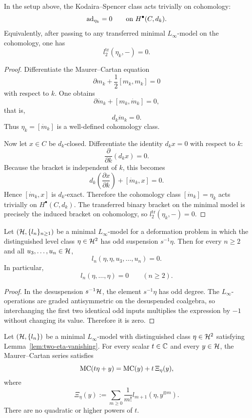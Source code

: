 \begin{theorem}
\label{thm:ks-centrality}
In the setup above, the Kodaira--Spencer class acts trivially on cohomology:
\[
\mathrm{ad}_{\eta_k}=0\qquad\text{on }H^\bullet(C,d_k).
\]
Equivalently, after passing to any transferred minimal $L_\infty$-model on the
cohomology, one has
\[
l_2^{\mathrm{tr}}(\eta_k,-)=0.
\]
\end{theorem}

\begin{proof}
Differentiate the Maurer--Cartan equation
\[
\partial m_k+\frac12[m_k,m_k]=0
\]
with respect to $k$.  One obtains
\[
\partial \dot m_k+[m_k,\dot m_k]=0,
\]
that is,
\[
d_k\dot m_k=0.
\]
Thus $\eta_k=[\dot m_k]$ is a well-defined cohomology class.

Now let $x\in C$ be $d_k$-closed.  Differentiate the identity $d_kx=0$ with
respect to $k$:
\[
\frac{\partial}{\partial k}(d_kx)=0.
\]
Because the bracket is independent of $k$, this becomes
\[
d_k\!\left(\frac{\partial x}{\partial k}\right)+[\dot m_k,x]=0.
\]
Hence $[\dot m_k,x]$ is $d_k$-exact.  Therefore the cohomology class
$[\dot m_k]=\eta_k$ acts trivially on $H^\bullet(C,d_k)$.  The transferred binary
bracket on the minimal model is precisely the induced bracket on cohomology, so
$l_2^{\mathrm{tr}}(\eta_k,-)=0$.\end{proof}

\begin{lemma}
\label{lem:two-eta-vanishing}
Let $(\mathcal{H},\{l_n\}_{n\ge 1})$ be a minimal $L_\infty$-model for a deformation
problem in which the distinguished level class $\eta\in \mathcal{H}^2$ has odd
suspension $s^{-1}\eta$.  Then for every $n\ge 2$ and all $u_3,\dots,u_n\in\mathcal{H}$,
\[
l_n(\eta,\eta,u_3,\dots,u_n)=0.
\]
In particular,
\[
l_n(\eta,\dots,\eta)=0\qquad(n\ge 2).
\]
\end{lemma}

\begin{proof}
In the desuspension $s^{-1}\mathcal{H}$, the element $s^{-1}\eta$ has odd degree.  The
$L_\infty$-operations are graded antisymmetric on the desuspended coalgebra, so
interchanging the first two identical odd inputs multiplies the expression by
$-1$ without changing its value.  Therefore it is zero.\end{proof}

\begin{theorem}
\label{thm:affine-normal-form}
Let $(\mathcal{H},\{l_n\})$ be a minimal $L_\infty$-model with distinguished class
$\eta\in \mathcal{H}^2$ satisfying Lemma~\ref{lem:two-eta-vanishing}.  For every scalar
$t\in\mathbb{C}$ and every $y\in\mathcal{H}$, the Maurer--Cartan series satisfies
\[
\mathrm{MC}(t\eta+y)=\mathrm{MC}(y)+t\,\Xi_\eta(y),
\]
where
\[
\Xi_\eta(y):=\sum_{m\ge 0}\frac{1}{m!}l_{m+1}(\eta,y^{\otimes m}).
\]
There are no quadratic or higher powers of $t$.
\end{theorem}

